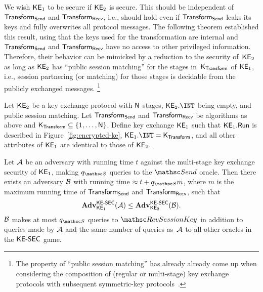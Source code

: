 We wish $\mathsf{KE}_1$ to be secure if $\mathsf{KE}_2$ is secure.
This should be independent of $\mathsf{Transform}_{\mathsf{Send}}$ and $\mathsf{Transform}_{\mathsf{Recv}}$, i.e., should hold even if $\mathsf{Transform}_{\mathsf{Send}}$ leaks its keys and fully overwrites all protocol messages.
The following theorem established this result, using that the keys used for the transformation are internal and $\mathsf{Transform}_{\mathsf{Send}}$ and $\mathsf{Transform}_{\mathsf{Recv}}$ have no access to other privileged information.
Therefore, their behavior can be mimicked by a reduction to the security of~$\mathsf{KE}_2$ as long as $\mathsf{KE}_2$ has ``public session matching'' for the stages in~$\mathsf{K}_{\mathsf{Transform}}$ of $\mathsf{KE}_1$, i.e., session partnering (or matching) for those stages is decidable from the publicly exchanged messages.%
\footnote{The property of ``public session matching'' has already already come up when considering the composition of (regular or multi-stage) key exchange protocols with subsequent symmetric-key protocols~\cite{CCS:BFWW11,CCS:DFGS15,EPRINT:DFGS15,thesis:Guenther18}.}

\begin{theorem}
	\label{thm:maul}
	Let $\mathsf{KE}_2$ be a key exchange protocol with $\mathsf{N}$ stages, $\KE_2.\INT$ being empty, and public session matching.
	Let $\mathsf{Transform}_{\mathsf{Send}}$ and $\mathsf{Transform}_{\mathsf{Recv}}$ be algorithms as above and $\mathsf{K}_{\mathsf{Transform}} \subseteq \{1, \ldots, \mathsf{N}\}$.
	Define key exchange $\mathsf{KE}_1$ such that $\mathsf{KE}_1.\mathsf{Run}$ is described in Figure~\ref{fig:encrypted-ke}, $\KE_1.\INT = \MaulKeys$, and all other attributes of $\mathsf{KE}_1$ are identical to those of $\mathsf{KE}_2$.
	
	Let $\mathcal{A}$ be an adversary with running time $t$ against the multi-stage key exchange security of $\mathsf{KE}_1$, making $\qSend$ queries to the $\Send$ oracle.
	Then there exists an adversary $\mathcal{B}$ with running time $\approx t + \qSend m$, where $m$ is the maximum running time of $\mathsf{Transform}_{\mathsf{Send}}$ and $\mathsf{Transform}_{\mathsf{Recv}}$, such that
	\[
	\mathbf{Adv}^{\mathrm{\mathsf{KE{\text{\normalfont-}}SEC}}}_{\mathsf{KE}_1}(\mathcal{A}) \leq \mathbf{Adv}^{\mathrm{\mathsf{KE{\text{\normalfont-}}SEC}}}_{\mathsf{KE}_2}(\mathcal{B}).
	\]
	$\mathcal{B}$ makes at most $\qSend$ queries to $\RevSessionKey$ in addition to queries made by $\mathcal{A}$
	and the same number of queries as~$\mathcal{A}$ to all other oracles in the $\mathsf{KE{\text{\normalfont-}}SEC}$ game.
\end{theorem}

